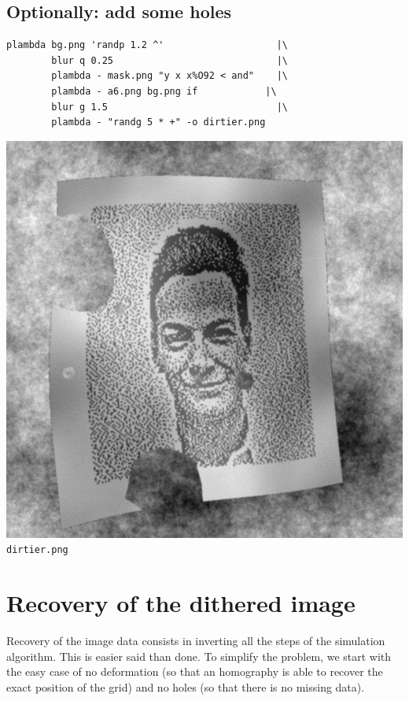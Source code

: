 \subsection{Optionally: add some holes}
\begin{verbatim}
plambda bg.png 'randp 1.2 ^'                    |\
        blur q 0.25                             |\
        plambda - mask.png "y x x%O92 < and"    |\
        plambda - a6.png bg.png if            |\
        blur g 1.5                              |\
        plambda - "randg 5 * +" -o dirtier.png
\end{verbatim}
\includegraphics{dirtier.png}\verb+dirtier.png+

\section{Recovery of the dithered image}

Recovery of the image data consists in inverting all the steps of the
simulation algorithm.  This is easier said than done.  To simplify the
problem, we start with the easy case of no deformation (so that an homography
is able to recover the exact position of the grid) and no holes (so that
there is no missing data).

